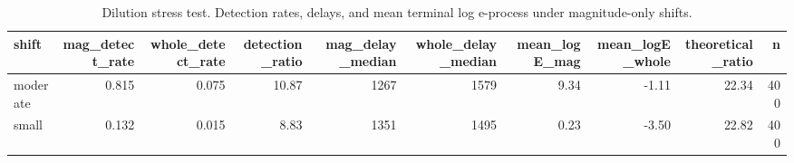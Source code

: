 \begin{table}

\caption{Dilution stress test. Detection rates, delays, and mean terminal log e-process under magnitude-only shifts.}
\centering
\begin{tabular}[t]{lrrrrrrrrr}
\toprule
shift & mag\_detect\_rate & whole\_detect\_rate & detection\_ratio & mag\_delay\_median & whole\_delay\_median & mean\_logE\_mag & mean\_logE\_whole & theoretical\_ratio & n\\
\midrule
moderate & 0.815 & 0.075 & 10.87 & 1267 & 1579 & 9.34 & -1.11 & 22.34 & 400\\
small & 0.132 & 0.015 & 8.83 & 1351 & 1495 & 0.23 & -3.50 & 22.82 & 400\\
\bottomrule
\end{tabular}
\end{table}
